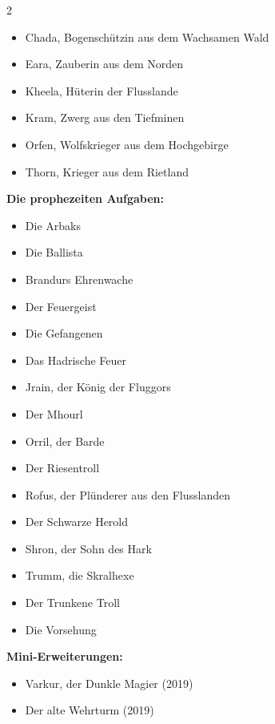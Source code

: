\documentclass[10pt, a4paper, oneside]{book}
\begin{document}
\begin{multicols}{2}
\begin{itemize}[topsep=0pt,itemsep=-1ex,partopsep=1ex,parsep=1ex]
    \item Chada, Bogenschützin aus dem Wachsamen Wald
    \item Eara, Zauberin aus dem Norden
    \item Kheela, Hüterin der Flusslande
    \item Kram, Zwerg aus den Tiefminen
    \item Orfen, Wolfskrieger aus dem Hochgebirge
    \item Thorn, Krieger aus dem Rietland
\end{itemize}


\textbf{Die prophezeiten Aufgaben:}


\begin{itemize}[topsep=0pt,itemsep=-1ex,partopsep=1ex,parsep=1ex]
    \item Die Arbaks
    \item Die Ballista
    \item Brandurs Ehrenwache
    \item Der Feuergeist
    \item Die Gefangenen
    \item Das Hadrische Feuer
    \item Jrain, der König der Fluggors
    \item Der Mhourl
    \item Orril, der Barde
    \item Der Riesentroll
    \item Rofus, der Plünderer aus den Flusslanden
    \item Der Schwarze Herold
    \item Shron, der Sohn des Hark
    \item Trumm, die Skralhexe
    \item Der Trunkene Troll
    \item Die Vorsehung
\end{itemize}



\textbf{Mini-Erweiterungen:}

\begin{itemize}[topsep=0pt,itemsep=-1ex,partopsep=1ex,parsep=1ex]
    \item Varkur, der Dunkle Magier (2019)
    \item Der alte Wehrturm (2019)
\end{itemize}






\end{multicols}
\end{document}
